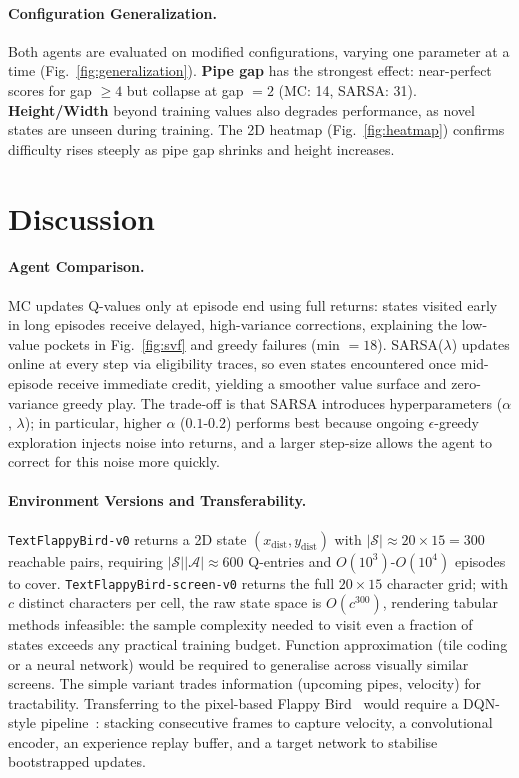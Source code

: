 \documentclass[runningheads]{llncs}
\begin{document}
\paragraph{Configuration Generalization.} Both agents are evaluated on modified configurations, varying one parameter at a time (Fig.~\ref{fig:generalization}). \textbf{Pipe gap} has the strongest effect: near-perfect scores for gap $\geq 4$ but collapse at gap $= 2$ (MC: 14, SARSA: 31). \textbf{Height/Width} beyond training values also degrades performance, as novel states are unseen during training. The 2D heatmap (Fig.~\ref{fig:heatmap}) confirms difficulty rises steeply as pipe gap shrinks and height increases.


\section{Discussion}
\paragraph{Agent Comparison.}
MC updates Q-values only at episode end using full returns: states visited early in long episodes receive delayed, high-variance corrections, explaining the low-value pockets in Fig.~\ref{fig:svf} and greedy failures (min $= 18$). SARSA($\lambda$) updates online at every step via eligibility traces, so even states encountered once mid-episode receive immediate credit, yielding a smoother value surface and zero-variance greedy play. The trade-off is that SARSA introduces hyperparameters ($\alpha$, $\lambda$); in particular, higher $\alpha$ ($0.1$-$0.2$) performs best because ongoing $\epsilon$-greedy exploration injects noise into returns, and a larger step-size allows the agent to correct for this noise more quickly.

\paragraph{Environment Versions and Transferability.}
\texttt{TextFlappyBird-v0} returns a 2D state $(x_\text{dist}, y_\text{dist})$ with $|\mathcal{S}|\approx 20\times 15 = 300$ reachable pairs, requiring $|\mathcal{S}||\mathcal{A}|\approx 600$ Q-entries and $O(10^3)$-$O(10^4)$ episodes to cover. \texttt{TextFlappyBird-screen-v0} returns the full $20{\times}15$ character grid; with $c$ distinct characters per cell, the raw state space is $O(c^{300})$, rendering tabular methods infeasible: the sample complexity needed to visit even a fraction of states exceeds any practical training budget. Function approximation (tile coding or a neural network) would be required to generalise across visually similar screens. The simple variant trades information (upcoming pipes, velocity) for tractability. Transferring to the pixel-based Flappy Bird~\cite{flappybird} would require a DQN-style pipeline~\cite{mnih2015}: stacking consecutive frames to capture velocity, a convolutional encoder, an experience replay buffer, and a target network to stabilise bootstrapped updates.
\end{document}
